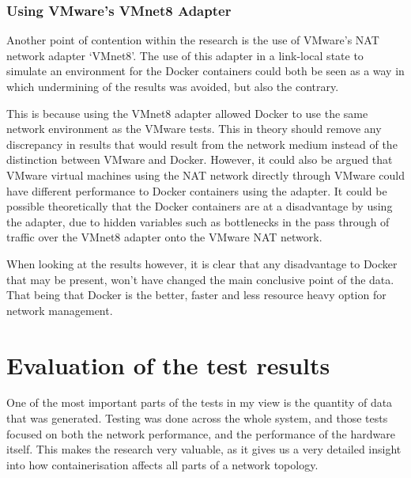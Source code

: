 \subsubsection{Using VMware's VMnet8 Adapter}%
Another point of contention within the research is the use of VMware's NAT network adapter `VMnet8'. The use of this adapter in a link-local state to simulate an environment for the Docker containers could both be seen as a way in which undermining of the results was avoided, but also the contrary.

This is because using the VMnet8 adapter allowed Docker to use the same network environment as the VMware tests. This in theory should remove any discrepancy in results that would result from the network medium instead of the distinction between VMware and Docker. However, it could also be argued that VMware virtual machines using the NAT network directly through VMware could have different performance to Docker containers using the adapter. It could be possible theoretically that the Docker containers are at a disadvantage by using the adapter, due to hidden variables such as bottlenecks in the pass through of traffic over the VMnet8 adapter onto the VMware NAT network.

When looking at the results however, it is clear that any disadvantage to Docker that may be present, won't have changed the main conclusive point of the data. That being that Docker is the better, faster and less resource heavy option for network management.

\section{Evaluation of the test results}
\label{sec:EvaluationTestResults}
One of the most important parts of the tests in my view is the quantity of data that was generated. Testing was done across the whole system, and those tests focused on both the network performance, and the performance of the hardware itself. This makes the research very valuable, as it gives us a very detailed insight into how containerisation affects all parts of a network topology.

